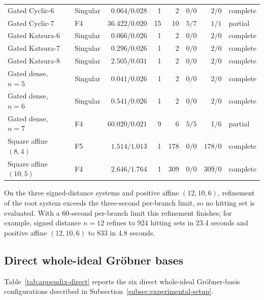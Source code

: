 \begin{table}[pos=htbp]
\begin{tabular}{l l r r r r r l}
Gated Cyclic-6 & Singular & $0.064/0.028$ & 1 & 2 & $0/0$ & $2/0$ & complete \\
Gated Cyclic-7 & F4 & $36.422/0.020$ & 15 & 10 & $5/7$ & $1/1$ & partial \\
Gated Katsura-6 & Singular & $0.066/0.026$ & 1 & 2 & $0/0$ & $2/0$ & complete \\
Gated Katsura-7 & Singular & $0.296/0.026$ & 1 & 2 & $0/0$ & $2/0$ & complete \\
Gated Katsura-8 & Singular & $2.505/0.031$ & 1 & 2 & $0/0$ & $2/0$ & complete \\
Gated dense, $n=5$ & Singular & $0.041/0.026$ & 1 & 2 & $0/0$ & $2/0$ & complete \\
Gated dense, $n=6$ & Singular & $0.541/0.026$ & 1 & 2 & $0/0$ & $2/0$ & complete \\
Gated dense, $n=7$ & F4 & $60.020/0.021$ & 9 & 6 & $5/5$ & $1/6$ & partial \\
Square affine $(8,4)$ & F5 & $1.514/1.013$ & 1 & 178 & $0/0$ & $178/0$ & complete \\
Square affine $(10,5)$ & F4 & $2.646/1.764$ & 1 & 309 & $0/0$ & $309/0$ & complete \\
\hline
\end{tabular}
\end{table}

On the three signed-distance systems and positive affine $(12,10,6)$, refinement of the
root system exceeds the three-second per-branch limit, so no hitting set is
evaluated.  With a 60-second per-branch limit this refinement finishes; for example,
signed distance $n=12$ refines to 924 hitting sets in 23.4 seconds and positive
affine $(12,10,6)$ to 833 in 4.8 seconds.
\FloatBarrier

\subsection{Direct whole-ideal Gr\"obner bases}

Table~\ref{tab:appendix-direct} reports the six direct whole-ideal
Gr\"obner-basis configurations described in
Subsection~\ref{subsec:experimental-setup}.

